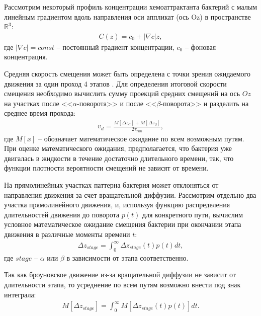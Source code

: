 Рассмотрим некоторый профиль концентрации хемоаттрактанта бактерий с малым линейным градиентом вдоль направления оси аппликат (ось Oz) в пространстве $\mathbb{R}^3$:
\begin{equation}
    \begin{aligned}
        C(z) = c_0 + |\nabla c| z,
    \label{eq:linear-concentration}
    \end{aligned}
\end{equation}
где $|\nabla c|=const$ -- постоянный градиент концентрации, $c_0$ -- фоновая концентрация.

Средняя скорость смещения может быть определена с точки зрения ожидаемого движения за один проход 4 этапов \cite{locsei_persistence_2007}. Для определения итоговой скорости смещения необходимо вычислить сумму проекций средних смещений на ось $Oz$ на участках после <<$\alpha$-поворота>> и после <<$\beta$-поворота>> и разделить на среднее время прохода:
\begin{equation}
    \begin{aligned}
        v_d=\frac{M[\Delta z_{\alpha}] + M[\Delta z_{\beta}]}{{2\tau_{run}}},
    \label{eq:drift-speed-alpha-beta}
    \end{aligned}
\end{equation}
где $M[x]$ -- обозначает математическое ожидание по всем возможным путям. При оценке математического ожидания, предполагается, что бактерия уже двигалась в жидкости в течение достаточно длительного времени, так, что функции плотности вероятности смещений не зависят от времени. 

На прямолинейных участках паттерна бактерия может отклоняться от направления движения за счет вращательной диффузии. Рассмотрим отдельно два участка прямолинейного движения, и, используя функцию распределения длительностей движения до поворота $p(t)$ для конкретного пути, вычислим условное математическое ожидание смещения бактерии при окончании этапа движения в различные моменты времени $t$:
\begin{equation}
    \begin{aligned}
        \Delta z_{stage}=\int_0^{\infty} \Delta z_{stage}(t)p(t)dt,
    \label{eq:displacement-integral-time}
    \end{aligned}
\end{equation}
где $stage$ -- $\alpha$ или $\beta$ в зависимости от этапа соответственно.

Так как броуновское движение из-за вращательной диффузии не зависит от длительности этапа, то усреднение по всем путям возможно внести под знак интеграла:
\begin{equation}
    \begin{aligned}
        M[\Delta z_{stage}]=\int_0^{\infty} M[\Delta z_{stage}(t)p(t)]dt.
    \label{eq:mean-displacement-integral-time}
    \end{aligned}
\end{equation}


